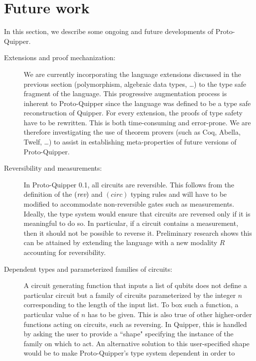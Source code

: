 \documentclass[twoside]{article}
\begin{document}
\clearpage
\section{Future work}\label{sec-future}

In this section, we describe some ongoing and future developments 
of Proto-Quipper.
\begin{description}
  \item[Extensions and proof mechanization:] We are 
    currently incorporating the language extensions discussed 
    in the previous section (polymorphism, algebraic data types, 
    \ldots) to the type safe fragment of the language. This 
    progressive augmentation process is inherent to Proto-Quipper 
    since the language was defined to be a type safe 
    reconstruction of Quipper. For every extension, the proofs 
    of type safety have to be rewritten. This is both time-consuming 
    and error-prone. We are therefore investigating the use 
    of theorem provers (such as Coq, Abella, Twelf, \ldots) to assist 
    in establishing meta-properties of future versions of 
    Proto-Quipper. 
  \item[Reversibility and measurements:] In Proto-Quipper 
    0.1, all circuits are reversible. This follows from the 
    definition of the $(\mathop{\textit{rev}}\nolimits)$ and $(circ)$ typing rules and will 
    have to be modified to accommodate non-reversible gates such 
    as measurements. Ideally, the type system would ensure that 
    circuits are reversed only if it is meaningful to do so. In 
    particular, if a circuit contains a measurement, then it 
    should not be possible to reverse it. Preliminary research 
    shows this can be attained by extending the language with a 
    new modality $R$ accounting for reversibility. 
  \item[Dependent types and parameterized families of circuits:] 
    A circuit generating function that inputs a list of qubits does not 
    define a particular circuit but a family of circuits parameterized 
    by the integer $n$ corresponding to the length of the input list.
    To box such a function, a particular value of $n$ has to be given. 
    This is also true of other higher-order functions acting on circuits, 
    such as reversing. In Quipper, this is handled by asking the user 
    to provide a ``shape" specifying the instance of the family on 
    which to act. An alternative solution to this user-specified shape 
    would be to make Proto-Quipper's type system dependent in order to 

\end{description}
\end{document}
